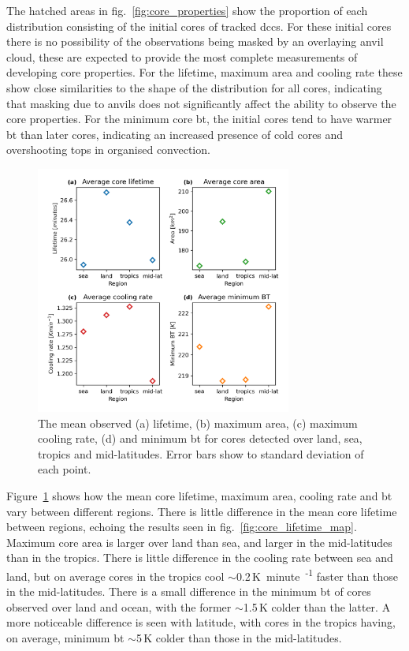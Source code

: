The hatched areas in fig.~\ref{fig:core_properties} show the proportion of each distribution consisting of the initial cores of tracked \acrshort{dcc}s.
For these initial cores there is no possibility of the observations being masked by an overlaying anvil cloud, these are expected to provide the most complete measurements of developing core properties.
For the lifetime, maximum area and cooling rate these show close similarities to the shape of the distribution for all cores, indicating that masking due to anvils does not significantly affect the ability to observe the core properties.
For the minimum core \acrshort{bt}, the initial cores tend to have warmer \acrshort{bt} than later cores, indicating an increased presence of cold cores and overshooting tops in organised convection.

\begin{figure}[tp]
    \centering
    \includegraphics[width=0.75\textwidth]{figures/chapter2_09.png}
    \caption[
    The mean observed lifetimes, maximum areas, cooling rates and \acrshort{bt} for cores detected over land, sea, tropics and mid-latitudes
    ]{
    The mean observed (a) lifetime, (b) maximum area, (c) maximum cooling rate, (d) and minimum \acrshort{bt} for cores detected over land, sea, tropics and mid-latitudes. Error bars show to standard deviation of each point.
    }
    \label{fig:core_region_mean_properties}
\end{figure}

Figure~\ref{fig:core_region_mean_properties} shows how the mean core lifetime, maximum area, cooling rate and \acrshort{bt} vary between different regions.
There is little difference in the mean core lifetime between regions, echoing the results seen in fig.~\ref{fig:core_lifetime_map}.
Maximum core area is larger over land than sea, and larger in the mid-latitudes than in the tropics.
There is little difference in the cooling rate between sea and land, but on average cores in the tropics cool $\sim$0.2\,\unit{K minute\textsuperscript{-1}} faster than those in the mid-latitudes.
There is a small difference in the minimum \acrshort{bt} of cores observed over land and ocean, with the former $\sim$1.5\,\unit{K} colder than the latter.
A more noticeable difference is seen with latitude, with cores in the tropics having, on average, minimum \acrshort{bt} $\sim$5\,\unit{K} colder than those in the mid-latitudes.

